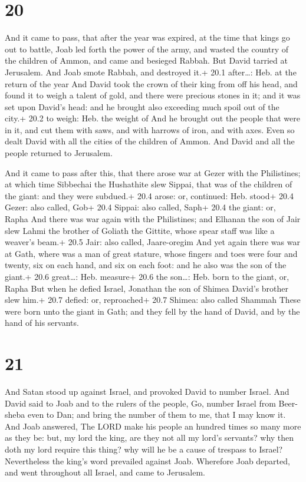 \hypertarget{section-19}{%
\section{20}\label{section-19}}

 And it came to pass, that after the year was expired, at
the time that kings go out to battle, Joab led forth the power of the
army, and wasted the country of the children of Ammon, and came and
besieged Rabbah. But David tarried at Jerusalem. And Joab smote Rabbah,
and destroyed it.+ 20.1 after\ldots: Heb. at the return of the year
 And David took the crown of their king from off his head,
and found it to weigh a talent of gold, and there were precious stones
in it; and it was set upon David's head: and he brought also exceeding
much spoil out of the city.+ 20.2 to weigh: Heb. the weight of
 And he brought out the people that were in it, and cut them
with saws, and with harrows of iron, and with axes. Even so dealt David
with all the cities of the children of Ammon. And David and all the
people returned to Jerusalem.

 And it came to pass after this, that there arose war at
Gezer with the Philistines; at which time Sibbechai the Hushathite slew
Sippai, that was of the children of the giant: and they were subdued.+
20.4 arose: or, continued: Heb. stood+ 20.4 Gezer: also called, Gob+
20.4 Sippai: also called, Saph+ 20.4 the giant: or, Rapha 
And there was war again with the Philistines; and Elhanan the son of
Jair slew Lahmi the brother of Goliath the Gittite, whose spear staff
was like a weaver's beam.+ 20.5 Jair: also called, Jaare-oregim
 And yet again there was war at Gath, where was a man of
great stature, whose fingers and toes were four and twenty, six on each
hand, and six on each foot: and he also was the son of the giant.+ 20.6
great\ldots: Heb. measure+ 20.6 the son\ldots: Heb. born to the giant,
or, Rapha  But when he defied Israel, Jonathan the son of
Shimea David's brother slew him.+ 20.7 defied: or, reproached+ 20.7
Shimea: also called Shammah  These were born unto the giant
in Gath; and they fell by the hand of David, and by the hand of his
servants.

\hypertarget{section-20}{%
\section{21}\label{section-20}}

 And Satan stood up against Israel, and provoked David to
number Israel.  And David said to Joab and to the rulers of
the people, Go, number Israel from Beer-sheba even to Dan; and bring the
number of them to me, that I may know it.  And Joab
answered, The LORD make his people an hundred times so many more as they
be: but, my lord the king, are they not all my lord's servants? why then
doth my lord require this thing? why will he be a cause of trespass to
Israel?  Nevertheless the king's word prevailed against
Joab. Wherefore Joab departed, and went throughout all Israel, and came
to Jerusalem.

